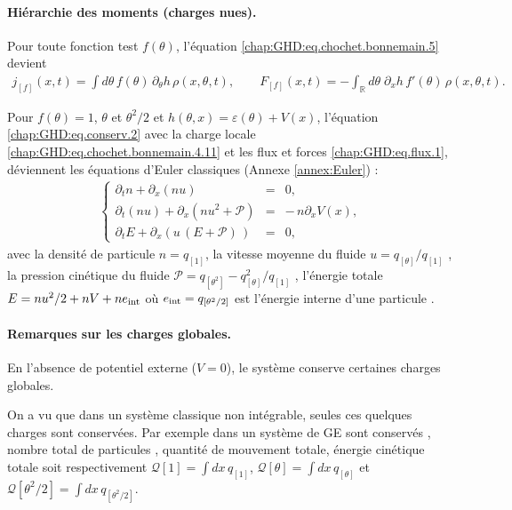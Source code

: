 \paragraph{Hiérarchie des moments (charges nues).}
Pour toute fonction test $f(\theta)$, l'équation \eqref{chap:GHD:eq.chochet.bonnemain.5} devient
\begin{eqnarray}\label{chap:GHD:eq.flux.1}
j_{[f]}(x,t)=\int d\theta\, f(\theta)\,\partial_\theta h\,\rho(x,\theta,t), \qquad F_{[f]}(x,t) = -\int_{\mathbb{R}} d\theta \; \partial_x h \, f'(\theta)  \, \rho(x,\theta,t).
\end{eqnarray}

Pour $f(\theta) = 1$, $\theta$ et $\theta^2/2$ et $h(\theta,x)=\varepsilon(\theta)+V(x)$, l'équation \eqref{chap:GHD:eq.conserv.2} avec la charge locale \eqref{chap:GHD:eq.chochet.bonnemain.4.11} et les flux et forces \eqref{chap:GHD:eq.flux.1}, déviennent les équations d’Euler classiques (Annexe \ref{annex:Euler}) :
\begin{eqnarray}\label{chap:3:eq:hydro.1}
	\left\{
	\begin{array}{rcl}
	\partial_t n + \partial_x (n u) &=& 0, \\
	\partial_t (n u) + \partial_x (nu^2 + \mathcal{P}) &=& -\, n\partial_x V(x), \\
	\partial_t E + \partial_x (u\,(E+\mathcal{P})\,) &=& 0,
	\end{array}
	\right .  
\end{eqnarray}
avec la densité de particule $n = q_{[1]}$, la vitesse moyenne du fluide $u = {q_{[\theta]}}/{q_{[1]}}$ , la pression cinétique du fluide $\mathcal{P} =  q_{[\theta^2]} - {q_{[\theta]}^2}/{q_{[1]}} $ , l'énergie totale $E = nu^2/2 + nV + ne_{\rm int}$ où $e_{\rm int} = q_{[\theta^2/2]}$ est l'énergie interne d'une particule .



\paragraph{Remarques sur les charges globales.}
En l’absence de potentiel externe ($V = 0$), le système conserve certaines charges globales.

\smallskip

On a vu que dans un système classique non intégrable, seules ces quelques charges sont conservées. Par exemple dans un système de \gls{GE} sont conservés , nombre total de particules , quantité de mouvement totale, énergie cinétique totale soit respectivement $\mathcal{Q}[1]  =  \int dx \, q_{[1]}$, $\mathcal{Q}[\theta] = \int dx \, q_{[\theta]}$ et $\mathcal{Q}[{\theta^2}/{2}] = \int dx \, q_{\left[{\theta^2}/{2}\right]} $. 


